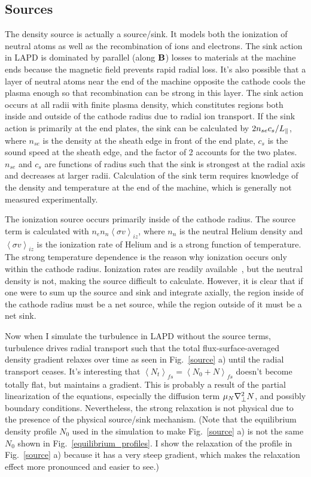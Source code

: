 \subsection{Sources}
\label{ss_sources}

The density source is actually a source/sink. It models both the ionization of neutral atoms as well as the recombination of ions and electrons. The sink action in LAPD
is dominated by parallel (along ${\bf B}$) losses to materials at the machine ends because the magnetic field prevents rapid radial loss. 
It's also possible that a layer of neutral atoms near the end of
the machine opposite the cathode cools the plasma enough so that recombination can be strong in this layer. The sink action occurs at all radii with finite plasma density, which constitutes regions
both inside and outside of the cathode radius due to radial ion transport. If the sink action is primarily at the end plates, the sink can be calculated by $2 n_{se} c_s/L_{\parallel}$, where
$n_{se}$ is the density at the sheath edge in front of the end plate, $c_s$ is the sound speed at the sheath edge, and the factor of 2 accounts for the two plates. $n_{se}$ and $c_s$ are functions
of radius such that the sink is strongest at the radial axis and decreases at larger radii. Calculation of the sink term requires knowledge of the density and temperature at the end of the machine,
which is generally not measured experimentally.

The ionization source occurs primarily inside of the cathode radius. The source term is calculated with $n_e n_n \left<\sigma v \right>_{iz}$, 
where $n_n$ is the neutral Helium density and $\left< \sigma v \right>_{iz}$
is the ionization rate of Helium and is a strong function of temperature. The strong temperature dependence is the reason why ionization occurs only within the cathode radius.
Ionization rates are readily available~\cite{stangeby2000}, but the neutral density is not, making the source difficult to calculate. However, it is clear that if one were to sum up
the source and sink and integrate axially, the region inside of the cathode radius must be a net source, while the region outside of it must be a net sink.

Now when I simulate the turbulence in LAPD without the source terms, turbulence drives radial transport such that the total flux-surface-averaged density gradient relaxes over time as seen
in Fig.~\ref{source} a) until the radial transport ceases. It's interesting that $\left< N_t \right>_{fs} = \left< N_0 + N \right>_{fs}$ doesn't become totally flat, but maintains a gradient. 
This is probably a result
of the partial linearization of the equations, especially the diffusion term $\mu_N \nabla_\perp^2 N$, and possibly boundary conditions. Nevertheless, the strong relaxation is not physical due
to the presence of the physical source/sink mechanism. (Note that the equilibrium density profile $N_0$ used in the simulation to make Fig.~\ref{source} a)
is not the same $N_0$ shown in Fig.~\ref{equilibrium_profiles}. I show the relaxation of the profile in Fig.~\ref{source} a) because it has a very steep gradient, which makes
the relaxation effect more pronounced and easier to see.)

